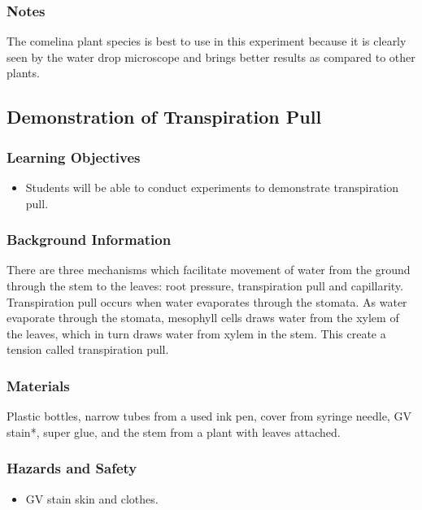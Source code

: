 \subsubsection*{Notes}
 The comelina plant species is best to use in this experiment because it is clearly seen by the water drop microscope and brings better results as compared to other plants.

\subsection{Demonstration of Transpiration Pull}

\subsubsection*{Learning Objectives}
\begin{itemize}
\item{Students will be able to conduct experiments to demonstrate transpiration pull.}
\end{itemize}

\subsubsection*{Background Information}
There are three mechanisms which facilitate movement of water from the ground through the stem to the leaves: root pressure, transpiration pull and capillarity. Transpiration pull occurs when water evaporates through the stomata. As water evaporate through the stomata, mesophyll cells draws water from the xylem of the leaves, which in turn draws water from xylem in the stem. This create a tension called transpiration pull.

\subsubsection*{Materials}
Plastic bottles, narrow tubes from a used ink pen, cover from syringe needle, GV stain*, super glue, and the stem from a plant with leaves attached.

\subsubsection*{Hazards and Safety}
\begin{itemize}
\item{GV stain skin and clothes.}
\end{itemize}

